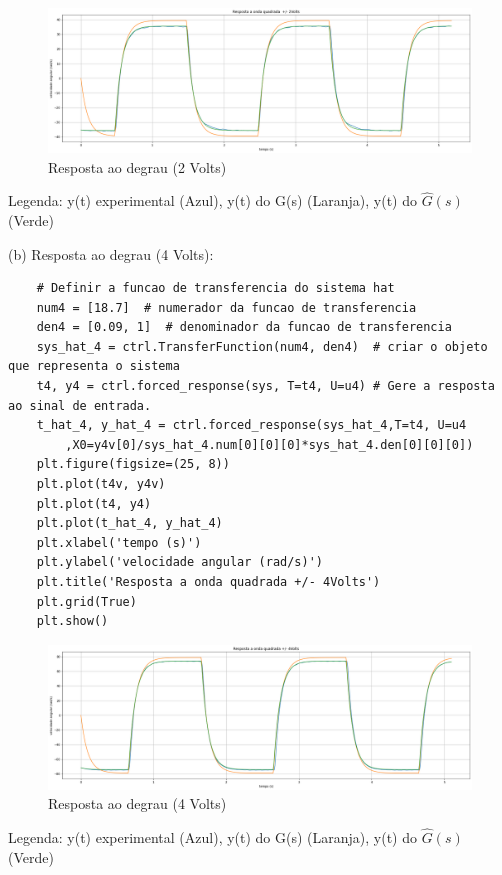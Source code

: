 \documentclass[10pt]{article}
\begin{document}
\begin{figure}[h]
    \centering
    \includegraphics[scale=0.32]{resposta2.png}
    \caption{Resposta ao degrau (2 Volts)}
\end{figure}

\quad Legenda: y(t) experimental (Azul), y(t) do G(s) (Laranja), y(t) do $\hat{G}(s)$ (Verde)

(b) Resposta ao degrau (4 Volts):

\begin{verbatim}
    # Definir a funcao de transferencia do sistema hat
    num4 = [18.7]  # numerador da funcao de transferencia
    den4 = [0.09, 1]  # denominador da funcao de transferencia
    sys_hat_4 = ctrl.TransferFunction(num4, den4)  # criar o objeto que representa o sistema
    t4, y4 = ctrl.forced_response(sys, T=t4, U=u4) # Gere a resposta ao sinal de entrada.
    t_hat_4, y_hat_4 = ctrl.forced_response(sys_hat_4,T=t4, U=u4
        ,X0=y4v[0]/sys_hat_4.num[0][0][0]*sys_hat_4.den[0][0][0])
    plt.figure(figsize=(25, 8))
    plt.plot(t4v, y4v)
    plt.plot(t4, y4)
    plt.plot(t_hat_4, y_hat_4)
    plt.xlabel('tempo (s)')
    plt.ylabel('velocidade angular (rad/s)')
    plt.title('Resposta a onda quadrada +/- 4Volts')
    plt.grid(True)
    plt.show()
\end{verbatim}

\begin{figure}[h]
    \centering
    \includegraphics[scale=0.32]{resposta4.png}
    \caption{Resposta ao degrau (4 Volts)}
\end{figure}

\quad Legenda: y(t) experimental (Azul), y(t) do G(s) (Laranja), y(t) do $\hat{G}(s)$ (Verde)
\end{document}
